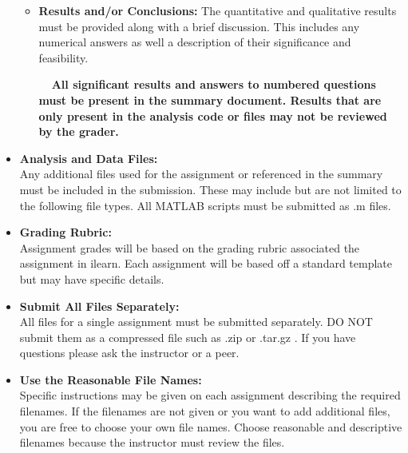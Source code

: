 \documentclass[12pt]{article}
\begin{document}
\begin{itemize}
\begin{itemize}
	\item {\bf Results and/or Conclusions:} The quantitative and qualitative results must be provided along with a brief discussion. This includes any numerical answers as well a description of their significance and feasibility. 
	
	{\bf    All significant results and answers to numbered questions must be present in the summary document. Results that are only present in the analysis code or files may not be reviewed by the grader. } \\
	
	

	\end{itemize}
	

\item {\bf Analysis and Data Files:} \vspace{2mm} \\  
Any additional files used for the assignment or referenced in the summary must be included in the submission. These may include but are not limited to the following file types. All MATLAB scripts must be submitted as .m files.

\newpage


	\item {\bf Grading Rubric:} \vspace{2mm} \\  
Assignment grades will be based on the grading rubric associated the assignment in ilearn. Each assignment will be based off a standard template but may have specific details. \\

    	\item {\bf Submit All Files Separately:} \vspace{2mm} \\  
All files for a single assignment must be submitted separately. DO NOT submit them as a compressed file such as .zip or .tar.gz . If you have questions please ask the instructor or a peer. \\
 
   	\item {\bf Use the Reasonable File Names:}\vspace{2mm} \\
Specific instructions may be given on each assignment describing the required filenames. If the filenames are not given or you want to add additional files, you are free to choose your own file names. Choose reasonable and descriptive filenames because the instructor must review the files. \\


\end{itemize}
\end{document}
